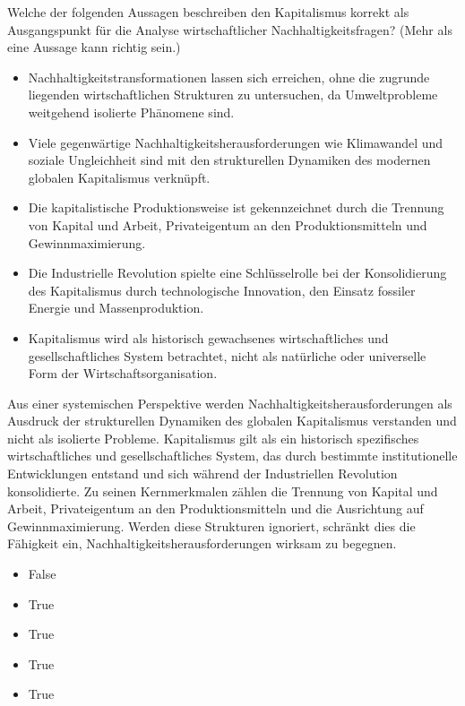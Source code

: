 \documentclass[
  nswissgerman,
  a4paper,
  DIV=11,
  numbers=noendperiod,
  oneside,
  openany]{scrreprt}
\providecommand{\tightlist}{%
  \setlength{\itemsep}{0pt}\setlength{\parskip}{0pt}}
\begin{document}
Welche der folgenden Aussagen beschreiben den Kapitalismus korrekt als
Ausgangspunkt für die Analyse wirtschaftlicher Nachhaltigkeitsfragen?
(Mehr als eine Aussage kann richtig sein.)

\begin{itemize}
\tightlist
\item[$\square$]
  Nachhaltigkeitstransformationen lassen sich erreichen, ohne die
  zugrunde liegenden wirtschaftlichen Strukturen zu untersuchen, da
  Umweltprobleme weitgehend isolierte Phänomene sind.
\item[$\square$]
  Viele gegenwärtige Nachhaltigkeitsherausforderungen wie Klimawandel
  und soziale Ungleichheit sind mit den strukturellen Dynamiken des
  modernen globalen Kapitalismus verknüpft.
\item[$\square$]
  Die kapitalistische Produktionsweise ist gekennzeichnet durch die
  Trennung von Kapital und Arbeit, Privateigentum an den
  Produktionsmitteln und Gewinnmaximierung.
\item[$\square$]
  Die Industrielle Revolution spielte eine Schlüsselrolle bei der
  Konsolidierung des Kapitalismus durch technologische Innovation, den
  Einsatz fossiler Energie und Massenproduktion.
\item[$\square$]
  Kapitalismus wird als historisch gewachsenes wirtschaftliches und
  gesellschaftliches System betrachtet, nicht als natürliche oder
  universelle Form der Wirtschaftsorganisation.
\end{itemize}

Aus einer systemischen Perspektive werden
Nachhaltigkeitsherausforderungen als Ausdruck der strukturellen
Dynamiken des globalen Kapitalismus verstanden und nicht als isolierte
Probleme. Kapitalismus gilt als ein historisch spezifisches
wirtschaftliches und gesellschaftliches System, das durch bestimmte
institutionelle Entwicklungen entstand und sich während der
Industriellen Revolution konsolidierte. Zu seinen Kernmerkmalen zählen
die Trennung von Kapital und Arbeit, Privateigentum an den
Produktionsmitteln und die Ausrichtung auf Gewinnmaximierung. Werden
diese Strukturen ignoriert, schränkt dies die Fähigkeit ein,
Nachhaltigkeitsherausforderungen wirksam zu begegnen.

\begin{itemize}
\tightlist
\item
  False
\item
  True
\item
  True
\item
  True
\item
  True
\end{itemize}
\end{document}
